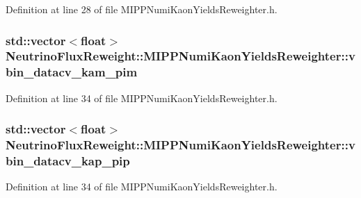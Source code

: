 Definition at line 28 of file M\-I\-P\-P\-Numi\-Kaon\-Yields\-Reweighter.\-h.

\hypertarget{class_neutrino_flux_reweight_1_1_m_i_p_p_numi_kaon_yields_reweighter_a862186e4424a3514fc7441fc40bb2be3}{
\subsubsection[{vbin\-\_\-datacv\-\_\-kam\-\_\-pim}]{\setlength{\rightskip}{0pt plus 5cm}std\-::vector$<$float$>$ Neutrino\-Flux\-Reweight\-::\-M\-I\-P\-P\-Numi\-Kaon\-Yields\-Reweighter\-::vbin\-\_\-datacv\-\_\-kam\-\_\-pim\hspace{0.3cm}{\ttfamily [private]}}}\label{class_neutrino_flux_reweight_1_1_m_i_p_p_numi_kaon_yields_reweighter_a862186e4424a3514fc7441fc40bb2be3}


Definition at line 34 of file M\-I\-P\-P\-Numi\-Kaon\-Yields\-Reweighter.\-h.

\hypertarget{class_neutrino_flux_reweight_1_1_m_i_p_p_numi_kaon_yields_reweighter_a1d8321111a686ae97238fb98ed7c1a1b}{
\subsubsection[{vbin\-\_\-datacv\-\_\-kap\-\_\-pip}]{\setlength{\rightskip}{0pt plus 5cm}std\-::vector$<$float$>$ Neutrino\-Flux\-Reweight\-::\-M\-I\-P\-P\-Numi\-Kaon\-Yields\-Reweighter\-::vbin\-\_\-datacv\-\_\-kap\-\_\-pip\hspace{0.3cm}{\ttfamily [private]}}}\label{class_neutrino_flux_reweight_1_1_m_i_p_p_numi_kaon_yields_reweighter_a1d8321111a686ae97238fb98ed7c1a1b}


Definition at line 34 of file M\-I\-P\-P\-Numi\-Kaon\-Yields\-Reweighter.\-h.

